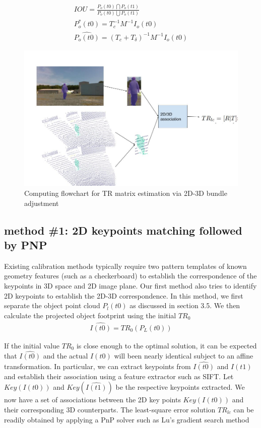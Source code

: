 \documentclass[journal]{IEEEtran}
\begin{document}
\begin{eqnarray}\label{eq:i1}
IOU = \frac{P_o(t0) \bigcap P_o(t1)}{P_o(t0) \bigcup P_o(t1)} \\
P_o^*(t0) = T_c^{-1} M^{-1} I_o(t0) \\
\hat{P_o(t0)} = (T_c + T_\delta)^{-1} M^{-1} I_o(t0)
\end{eqnarray}
\begin{figure}[]
    \centering
    \includegraphics[width=\columnwidth]{images/computing_flowchat.jpg}
    \caption{Computing flowchart for TR matrix estimation via 2D-3D bundle adjustment}
    \label{fig:framework}
\end{figure}  

\subsection{method \#1: 2D keypoints matching followed by PNP}
Existing calibration methods typically require two pattern templates of known geometry features (such as a checkerboard) to establish the correspondence of the keypoints in 3D space and 2D image plane. Our first method also tries to identify 2D keypoints to establish the 2D-3D correspondence. In this method, we first separate the object point cloud $P_l(t0)$ as discussed in section 3.5. We then calculate the projected object footprint using the initial $TR_0$ 
\begin{eqnarray}
    \hat{I(t0)} = TR_0 (P_L(t0))
\end{eqnarray}

If the initial value $TR_0$ is close enough to the optimal solution, it can be expected that 
$\hat{I(t0)}$ and the actual $I(t0)$ will been nearly identical subject to an affine transformation. In particular, we can extract keypoints from $\hat{I(t0)}$ and $I(t1)$ and establish their association using a feature extractor such as SIFT. Let $Key(I(t0)) $ and $Key(\hat{I(t1)}) $ be the respective keypoints extracted. We now have a set of associations between the 2D key points $Key(I(t0)) $ and their corresponding 3D counterparts. The least-square error solution $TR_{lc} $ can be readily obtained by applying a PnP solver such as Lu's gradient search method \cite{lu}
\end{document}

